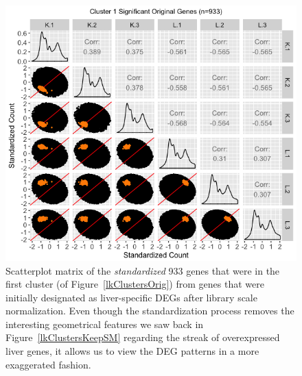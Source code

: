 \documentclass{article}
\begin{document}
\null
\begin{figure}[t!]
\centerline{\includegraphics[width=1\columnwidth]{../MakeFigures/lkClustersOrigSM-St.jpg}}
\caption{Scatterplot matrix of the \textit{standardized} 933 genes that were in the first cluster (of Figure~\ref{lkClustersOrig}) from genes that were initially designated as liver-specific DEGs after library scale normalization. Even though the standardization process removes the interesting geometrical features we saw back in Figure~\ref{lkClustersKeepSM} regarding the streak of overexpressed liver genes, it allows us to view the DEG patterns in a more exaggerated fashion.
\label{lkClustersOrigSM-St}}
\end{figure}
\end{document}
